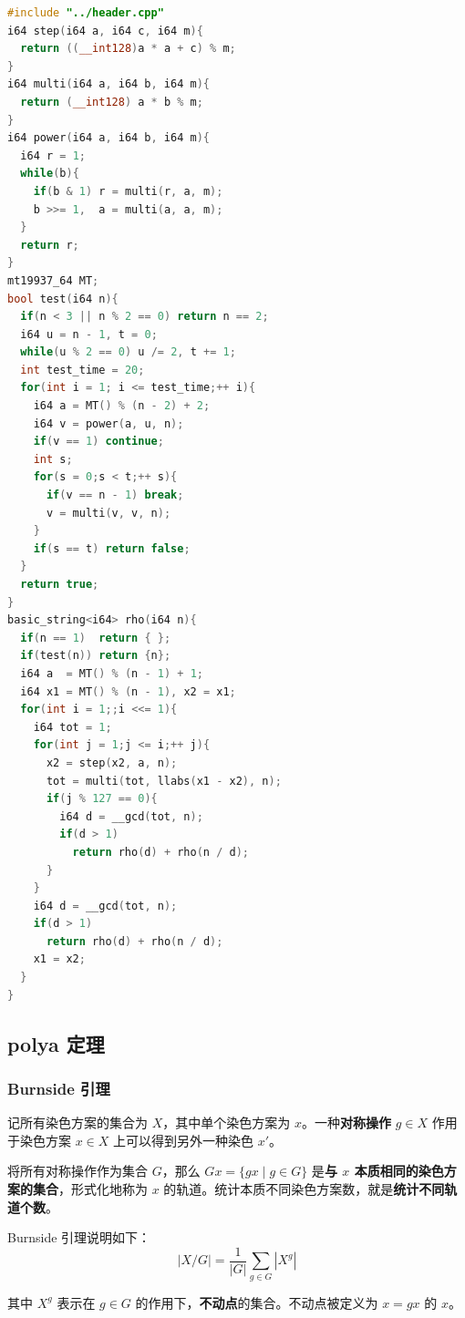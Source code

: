 \documentclass[10pt]{ctexart}
\begin{document}
\begin{multicols}{3}
\begin{lstlisting}[language={C++}]
#include "../header.cpp"
i64 step(i64 a, i64 c, i64 m){
  return ((__int128)a * a + c) % m;
}
i64 multi(i64 a, i64 b, i64 m){
  return (__int128) a * b % m;
}
i64 power(i64 a, i64 b, i64 m){
  i64 r = 1;
  while(b){
    if(b & 1) r = multi(r, a, m);
    b >>= 1,  a = multi(a, a, m);
  }
  return r;
}
mt19937_64 MT;
bool test(i64 n){
  if(n < 3 || n % 2 == 0) return n == 2;
  i64 u = n - 1, t = 0;
  while(u % 2 == 0) u /= 2, t += 1;
  int test_time = 20;
  for(int i = 1; i <= test_time;++ i){
    i64 a = MT() % (n - 2) + 2;
    i64 v = power(a, u, n);
    if(v == 1) continue;
    int s;
    for(s = 0;s < t;++ s){
      if(v == n - 1) break;
      v = multi(v, v, n);
    }
    if(s == t) return false;
  }
  return true;
}
basic_string<i64> rho(i64 n){
  if(n == 1)  return { };
  if(test(n)) return {n};
  i64 a  = MT() % (n - 1) + 1;
  i64 x1 = MT() % (n - 1), x2 = x1;
  for(int i = 1;;i <<= 1){
    i64 tot = 1;
    for(int j = 1;j <= i;++ j){
      x2 = step(x2, a, n);
      tot = multi(tot, llabs(x1 - x2), n);
      if(j % 127 == 0){
        i64 d = __gcd(tot, n);
        if(d > 1)
          return rho(d) + rho(n / d);
      }
    }
    i64 d = __gcd(tot, n);
    if(d > 1)
      return rho(d) + rho(n / d);
    x1 = x2;
  }
}
\end{lstlisting}

    \subsection{polya 定理}\label{polya-ux5b9aux7406}

    \subsubsection{Burnside 引理}\label{burnside-ux5f15ux7406}

    记所有染色方案的集合为 \(X\)，其中单个染色方案为
    \(x\)。一种\textbf{对称操作} \(g\in X\) 作用于染色方案 \(x\in X\)
    上可以得到另外一种染色 \(x'\)。

    将所有对称操作作为集合 \(G\)，那么 \(Gx = \{gx \mid g\in G\}\)
    是\textbf{与 \(x\) 本质相同的染色方案的集合}，形式化地称为 \(x\)
    的轨道。统计本质不同染色方案数，就是\textbf{统计不同轨道个数}。

    Burnside 引理说明如下：\[
    |X / G| = \frac{1}{|G|} \sum_{g\in G}|X^g|
    \]

    其中 \(X^g\) 表示在 \(g\in G\)
    的作用下，\textbf{不动点}的集合。不动点被定义为 \(x = gx\) 的
    \(x\)。


\end{multicols}
\end{document}
